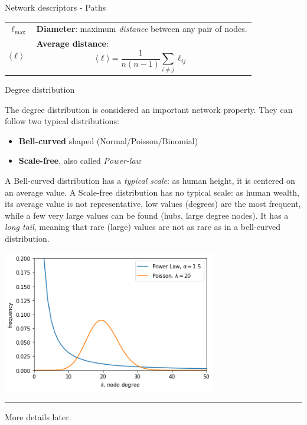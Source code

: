 \documentclass[a4paper,11pt]{book}
\begin{document}
\begin{textbox}{Network descriptors - Paths}
\begin{tabular}{p{}|p{}}\scriptsize





$\ell_{\max}$ & \textbf{Diameter}: maximum \textit{distance} between any pair of nodes.\\


$\langle \ell \rangle$ & \textbf{Average distance}:
\[
\langle \ell \rangle = \frac{1}{n(n-1)}\sum_{i\neq j} \ell_{ij}
\]\\

\end{tabular}

\end{textbox}










\begin{textbox}{Degree distribution}

The degree distribution is considered an important network property. They can follow two typical distributions: 
\begin{itemize}
    \item \textbf{Bell-curved} shaped (Normal/Poisson/Binomial)
    \item \textbf{Scale-free}, also called \textit{Power-law}
\end{itemize}
A Bell-curved distribution has a \textit{typical scale}: as human height, it is centered on an average value. A Scale-free distribution has no typical scale: as human wealth, its average value is not representative, low values (degrees) are the most frequent, while a few very large values can be found (hubs, large degree nodes). It has a \textit{long tail}, meaning that rare (large) values are not as rare as in a bell-curved distribution. 

\centering
\includegraphics[width=0.7\textwidth]{pics/distribution.png}


\noindent\rule{4cm}{0.1pt}

\tiny{
More details later.}
\end{textbox}
\end{document}
